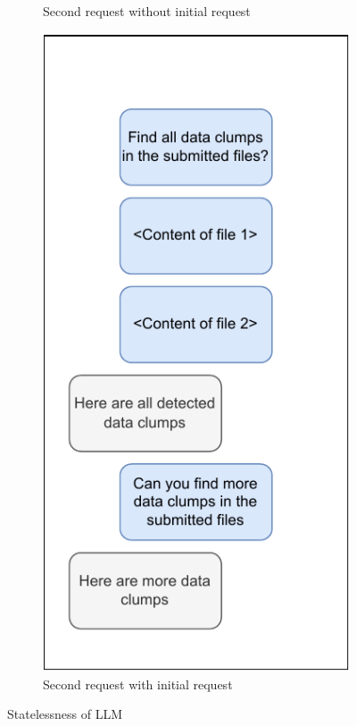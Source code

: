 {\begin{figure}
\begin{adjustbox}{minipage=\linewidth,scale=0.7}
\begin{subfigure}[b]{0.30\textwidth}
         \caption{Second request without initial request}
         \label{fig:llm_stateless2}
     \end{subfigure}
     \hfill
     \begin{subfigure}[b]{0.3459\textwidth}
         \centering
         \includegraphics[width=\textwidth]{figures/chapter2/chatgpt_stateless_3.drawio.pdf}
 \caption{Second request with initial request}         \label{fig:llm_stateless3}
     \end{subfigure}
        \caption{Statelessness of \ac{LLM}}
        \label{fig:llm_stateless}
        \end{adjustbox}
\end{figure}

}
